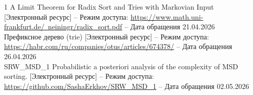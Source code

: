 \documentclass[a4paper, 12pt]{article}
\begin{document}
\newpage
\begin{thebibliography}{1}
     A Limit Theorem for Radix Sort and Tries with Markovian Input [Электронный ресурс] -- Режим доступа: \href{https://www.math.uni-frankfurt.de/~neiningr/radix\_sort.pdf}{https://www.math.uni-frankfurt.de/~neiningr/radix\_sort.pdf} -- Дата обращения 21.04.2026\\
     Префиксное дерево (trie) [Электронный ресурс] -- Режим доступа: \href{https://habr.com/ru/companies/otus/articles/674378/}{https://habr.com/ru/companies/otus/articles/674378/} -- Дата обращения 26.04.2026\\
     SRW\_MSD\_1 Probabilistic a posteriori analysis of the complexity of MSD sorting. [Электронный ресурс] -- Режим доступа: \href{https://github.com/SashaErkhov/SRW\_MSD\_1}{https://github.com/SashaErkhov/SRW\_MSD\_1} -- Дата обращения 02.05.2026
\end{thebibliography}
\end{document}
